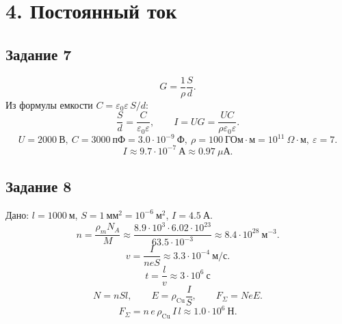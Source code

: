 \documentclass[12pt,a4paper]{article}
\begin{document}
\section*{4. Постоянный ток}

\subsection*{Задание 7}
\[
G=\frac{1}{\rho}\frac{S}{d}.
\]
Из формулы емкости $C=\varepsilon_0\varepsilon\,S/d$:
\[
\frac{S}{d}=\frac{C}{\varepsilon_0\varepsilon},
\qquad
I=UG=\frac{UC}{\rho\varepsilon_0\varepsilon}.
\]
\[
U=2000\ \text{В},\ 
C=3000\ \text{пФ}=3.0\cdot10^{-9}\ \text{Ф},\ 
\rho=100\ \text{ГОм}\cdot\text{м}=10^{11}\ \Omega\cdot\text{м},\ 
\varepsilon=7.
\]
\[
I\approx 9.7\cdot10^{-7}\ \text{А}\approx 0.97\ \mu\text{А}.
\]

\subsection*{Задание 8}
Дано: $l=1000\ \text{м}$, $S=1\ \text{мм}^2=10^{-6}\ \text{м}^2$, $I=4.5\ \text{А}$.
\[
n=\frac{\rho_mN_A}{M}\approx
\frac{8.9\cdot10^3\cdot 6.02\cdot10^{23}}{63.5\cdot10^{-3}}
\approx 8.4\cdot10^{28}\ \text{м}^{-3}.
\]
\[
v=\frac{I}{neS}\approx 3.3\cdot10^{-4}\ \text{м/с}.
\]
\[
t=\frac{l}{v}\approx 3\cdot10^6\ \text{с}
\]
\[
N=nSl,\qquad E=\rho_{\text{Cu}}\frac{I}{S},\qquad F_\Sigma=NeE.
\]
\[
F_\Sigma=n\,e\,\rho_{\text{Cu}}\,I\,l\approx 1.0\cdot10^6\ \text{Н}.
\]
\end{document}

